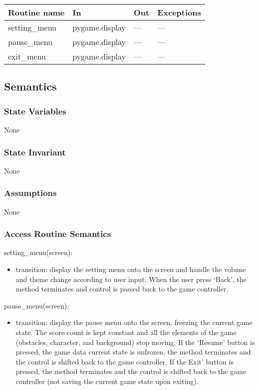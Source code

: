 \documentclass[12pt]{article}
\begin{document}
\begin{tabular}{| l | l | l | l |}
\hline
\textbf{Routine name} & \textbf{In} & \textbf{Out} & \textbf{Exceptions}\\
\hline
    setting\_menu & pygame.display & --- & ---\\
\hline
    pause\_menu & pygame.display & --- & ---\\
\hline
    exit\_menu & pygame.display & --- & ---\\
\hline
\end{tabular}

\subsection* {Semantics}

\subsubsection* {State Variables}

None

\subsubsection* {State Invariant}

None

\subsubsection* {Assumptions}

None

\subsubsection* {Access Routine Semantics}
\noindent setting\_menu(screen):
\begin{itemize}
    \item transition: display the setting menu onto the screen and handle the volume and theme change according to user input. When the user press `Back', the method terminates and control is passed back to the game controller.
\end{itemize}

\noindent pause\_menu(screen):
\begin{itemize}
    \item transition: display the pause menu onto the screen, freezing the current game state. The score count is kept constant and all the elements of the game (obstacles, character, and background) stop moving. If the `Resume' button is pressed, the game data current state is unfrozen, the method terminates and the control is shifted back to the game controller. If the Exit' button is pressed, the method terminates and the control is shifted back to the game controller (not saving the current game state upon exiting).
\end{itemize}
\end{document}
